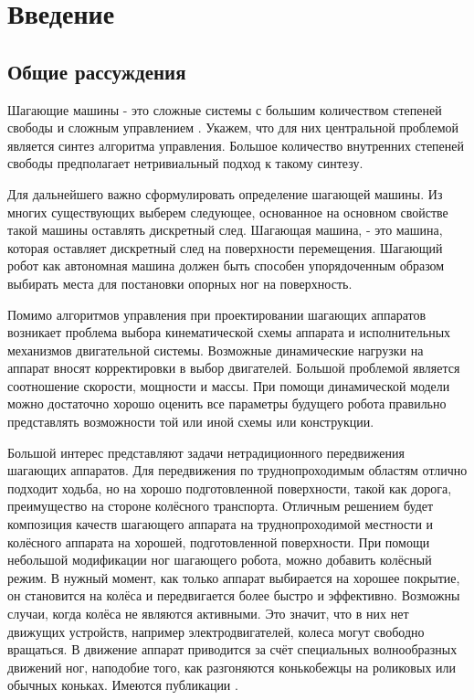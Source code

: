 \chapter*{Введение}							%


\section*{Общие рассуждения}
Шагающие машины - это сложные системы с большим количеством степеней свободы и сложным управлением \cite{1984,2012}. Укажем, что для них центральной проблемой является синтез алгоритма управления. Большое количество внутренних степеней свободы предполагает нетривиальный подход к такому синтезу. 

Для дальнейшего важно сформулировать определение шагающей машины. Из многих существующих выберем следующее, основанное на основном свойстве такой машины оставлять дискретный след. Шагающая машина, - это машина, которая оставляет дискретный след на поверхности перемещения. Шагающий робот как автономная машина должен быть способен упорядоченным образом выбирать места для постановки опорных ног на поверхность.

Помимо алгоритмов управления при проектировании шагающих аппаратов возникает проблема выбора кинематической схемы аппарата и исполнительных механизмов двигательной системы. Возможные динамические нагрузки на аппарат вносят корректировки в выбор двигателей. Большой проблемой является соотношение скорости, мощности и массы. При помощи динамической модели можно достаточно хорошо оценить все параметры будущего робота правильно представлять возможности той или иной схемы или конструкции.


Большой интерес представляют задачи нетрадиционного передвижения шагающих аппаратов. Для передвижения по труднопроходимым областям отлично подходит ходьба, но на хорошо подготовленной поверхности, такой как дорога, преимущество на стороне колёсного транспорта. Отличным решением будет композиция качеств шагающего аппарата на труднопроходимой местности и колёсного аппарата на хорошей, подготовленной поверхности. При помощи небольшой модификации ног шагающего робота, можно добавить колёсный режим. В нужный момент, как только аппарат выбирается на хорошее покрытие, он становится на колёса и передвигается более быстро и эффективно. Возможны случаи, когда колёса не являются активными. Это значит, что в них нет движущих устройств, например электродвигателей, колеса могут свободно вращаться. В движение аппарат приводится за счёт специальных волнообразных движений ног, наподобие того, как разгоняются конькобежцы на роликовых или обычных коньках. Имеются публикации \cite{Roller-walker,Endo2000,GenEndo2012}.

